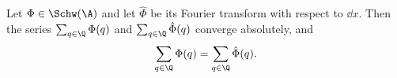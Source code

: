 Let $\Phi\in\Schw(\A)$ and let $\hat\Phi$ be its Fourier transform with respect to $\dd x$. Then the series
$\sum_{q\in\Q}\Phi(q)$ and $\sum_{q\in\Q}\hat\Phi(q)$ converge absolutely, and
\[
  \sum_{q\in\Q}\Phi(q)=\sum_{q\in\Q}\hat\Phi(q).
\]
